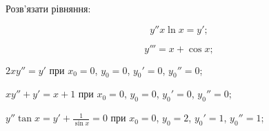 Розв'язати рівняння:
\begin{multicols}{2}
    \begin{problem}
    	\[ y''  x  \ln x = y';\]
    \end{problem}
    
    \begin{problem}
    	\[y''' = x + \cos x;\]
    \end{problem}
\end{multicols}

\begin{problem}
	$2 x y'' = y'$ при $x_0 = 0$, $y_0 = 0$, $y_0' = 0$, $y_0'' = 0$;
\end{problem}

\begin{problem}
	$x y'' + y' = x + 1$ при $x_0 = 0$, $y_0 = 0$, $y_0' = 0$, $y_0'' = 0$;
\end{problem}

\begin{problem}
	$y'' \tan x = y' + \frac{1}{\sin x} = 0$ при $x_0 = 0$, $y_0 = 2$, $y_0' = 1$, $y_0'' = 1$;
\end{problem}

